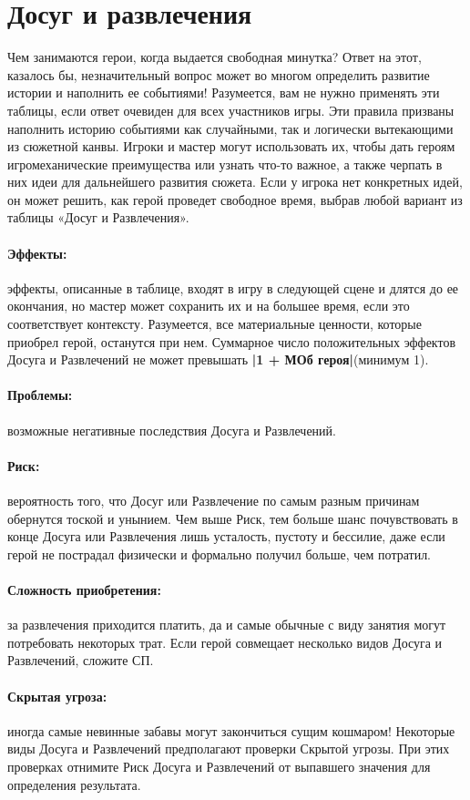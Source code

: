 \section{Досуг и развлечения}
Чем занимаются герои, когда выдается свободная минутка? Ответ на этот, казалось бы, незначительный вопрос может во многом определить развитие истории и наполнить ее событиями! Разумеется, вам не нужно применять эти таблицы, если ответ очевиден для всех участников игры. Эти правила призваны наполнить историю событиями как случайными, так и логически вытекающими из сюжетной канвы. Игроки и мастер могут использовать их, чтобы дать героям игромеханические преимущества или узнать что-то важное, а также черпать в них идеи для дальнейшего развития сюжета. Если у игрока нет конкретных идей, он может решить, как герой проведет свободное время, выбрав любой вариант из таблицы «Досуг и Развлечения».
\paragraph{Эффекты:} эффекты, описанные в таблице, входят в игру в следующей сцене и длятся до ее окончания, но мастер может сохранить их и на большее время, если это соответствует контексту. Разумеется, все материальные ценности, которые приобрел герой, останутся при нем. Суммарное число положительных эффектов Досуга и Развлечений не может превышать \textbf{|1 + МОб героя|}(минимум 1).
\paragraph{Проблемы:} возможные негативные последствия Досуга и Развлечений.
\paragraph{Риск:} вероятность того, что Досуг или Развлечение по самым разным причинам обернутся тоской и унынием. Чем выше Риск, тем больше шанс почувствовать в конце Досуга или Развлечения лишь усталость, пустоту и бессилие, даже если герой не пострадал физически и формально получил больше, чем потратил.
\paragraph{Сложность приобретения:} за развлечения приходится платить, да и самые обычные с виду занятия могут потребовать некоторых трат. Если герой совмещает несколько видов Досуга и Развлечений, сложите СП.
\paragraph{Скрытая угроза:} иногда самые невинные забавы могут закончиться сущим кошмаром! Некоторые виды Досуга и Развлечений предполагают проверки Скрытой угрозы. При этих проверках отнимите Риск Досуга и Развлечений от выпавшего значения для определения результата.
